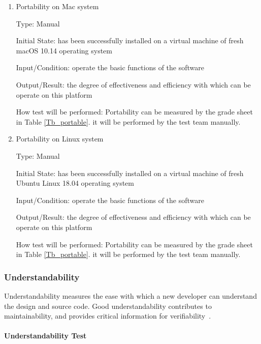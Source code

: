 \documentclass[12pt, titlepage]{article}
\begin{document}
\begin{enumerate}
\item{Portability on Mac system}

Type: Manual
					
Initial State: \progname{} has been successfully installed on a virtual machine
of fresh macOS 10.14 operating system
					
Input/Condition: operate the basic functions of the software
					
Output/Result: the degree of effectiveness and efficiency
with which \progname{} can be operate on this platform
					
How test will be performed: Portability can be measured by the grade sheet in
Table \ref{Tb_portable}. it will be performed by the test team manually.

\item{Portability on Linux system}

Type: Manual
					
Initial State: \progname{} has been successfully installed on a virtual machine
of fresh Ubuntu Linux 18.04 operating system
					
Input/Condition: operate the basic functions of the software
					
Output/Result: the degree of effectiveness and efficiency
with which \progname{} can be operate on this platform
					
How test will be performed: Portability can be measured by the grade sheet in
Table \ref{Tb_portable}. it will be performed by the test team manually.
\end{enumerate}

\subsubsection{Understandability}
\label{sec_understandtest}

Understandability measures the ease with which a new developer can understand
the design and source code. Good understandability contributes to
maintainability, and provides critical information for
verifiability~\cite{SmithEtAl2018}.

\paragraph{Understandability Test}
\end{document}
